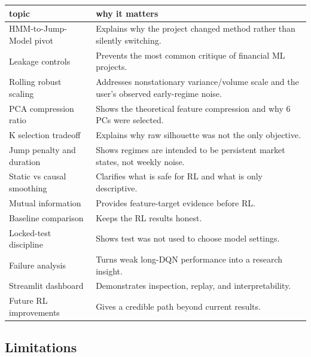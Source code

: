 {\def\LTcaptype{none} %
\begin{longtable}[]{@{}
  >{\raggedright\arraybackslash}p{}
  >{\raggedright\arraybackslash}p{}@{}}
\toprule\noalign{}
\begin{minipage}[b]{\linewidth}\raggedright
topic
\end{minipage} & \begin{minipage}[b]{\linewidth}\raggedright
why it matters
\end{minipage} \\
\midrule\noalign{}
\endhead
\bottomrule\noalign{}
\endlastfoot
HMM-to-Jump-Model pivot & Explains why the project changed method rather
than silently switching. \\
Leakage controls & Prevents the most common critique of financial ML
projects. \\
Rolling robust scaling & Addresses nonstationary variance/volume scale
and the user's observed early-regime noise. \\
PCA compression ratio & Shows the theoretical feature compression and
why 6 PCs were selected. \\
K selection tradeoff & Explains why raw silhouette was not the only
objective. \\
Jump penalty and duration & Shows regimes are intended to be persistent
market states, not weekly noise. \\
Static vs causal smoothing & Clarifies what is safe for RL and what is
only descriptive. \\
Mutual information & Provides feature-target evidence before RL. \\
Baseline comparison & Keeps the RL results honest. \\
Locked-test discipline & Shows test was not used to choose model
settings. \\
Failure analysis & Turns weak long-DQN performance into a research
insight. \\
Streamlit dashboard & Demonstrates inspection, replay, and
interpretability. \\
Future RL improvements & Gives a credible path beyond current
results. \\
\end{longtable}
}

\subsection{Limitations}\label{limitations}


